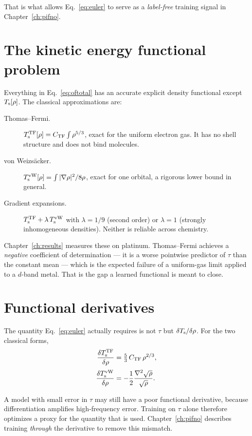 That is what allows Eq.~\eqref{eq:euler} to serve as a \emph{label-free}
training signal in Chapter~\ref{ch:pifno}.

\section{The kinetic energy functional problem}

Everything in Eq.~\eqref{eq:oftotal} has an accurate explicit density
functional except $T_{\mathrm{s}}[\rho]$. The classical approximations are:

\begin{description}
  \item[Thomas--Fermi.] $T_{\mathrm{s}}^{\mathrm{TF}}[\rho]=C_{\mathrm{TF}}\int\rho^{5/3}$,
    exact for the uniform electron gas. It has no shell structure and does not
    bind molecules.
  \item[von Weizsäcker.] $T_{\mathrm{s}}^{\mathrm{vW}}[\rho]=\int|\nabla\rho|^2/8\rho$,
    exact for one orbital, a rigorous lower bound in general.
  \item[Gradient expansions.] $T_{\mathrm{s}}^{\mathrm{TF}} + \lambda\,T_{\mathrm{s}}^{\mathrm{vW}}$
    with $\lambda=1/9$ (second order) or $\lambda=1$ (strongly inhomogeneous
    densities). Neither is reliable across chemistry.
\end{description}

Chapter~\ref{ch:results} measures these on platinum. Thomas--Fermi achieves a
\emph{negative} coefficient of determination --- it is a worse pointwise
predictor of $\tau$ than the constant mean --- which is the expected failure of
a uniform-gas limit applied to a $d$-band metal. That is the gap a learned
functional is meant to close.

\section{Functional derivatives}

The quantity Eq.~\eqref{eq:euler} actually requires is not $\tau$ but
$\delta T_{\mathrm{s}}/\delta\rho$. For the two classical forms,
\begin{align}
  \frac{\delta T_{\mathrm{s}}^{\mathrm{TF}}}{\delta\rho}
    &= \tfrac{5}{3}\,C_{\mathrm{TF}}\,\rho^{2/3},
  \label{eq:tfpot}\\[2pt]
  \frac{\delta T_{\mathrm{s}}^{\mathrm{vW}}}{\delta\rho}
    &= -\frac{1}{2}\frac{\nabla^2\sqrt{\rho}}{\sqrt{\rho}} .
  \label{eq:vwpot}
\end{align}

\begin{pwarn}
A model with small error in $\tau$ may still have a poor functional derivative,
because differentiation amplifies high-frequency error. Training on $\tau$ alone
therefore optimizes a proxy for the quantity that is used. Chapter~\ref{ch:pifno}
describes training \emph{through} the derivative to remove this mismatch.
\end{pwarn}

